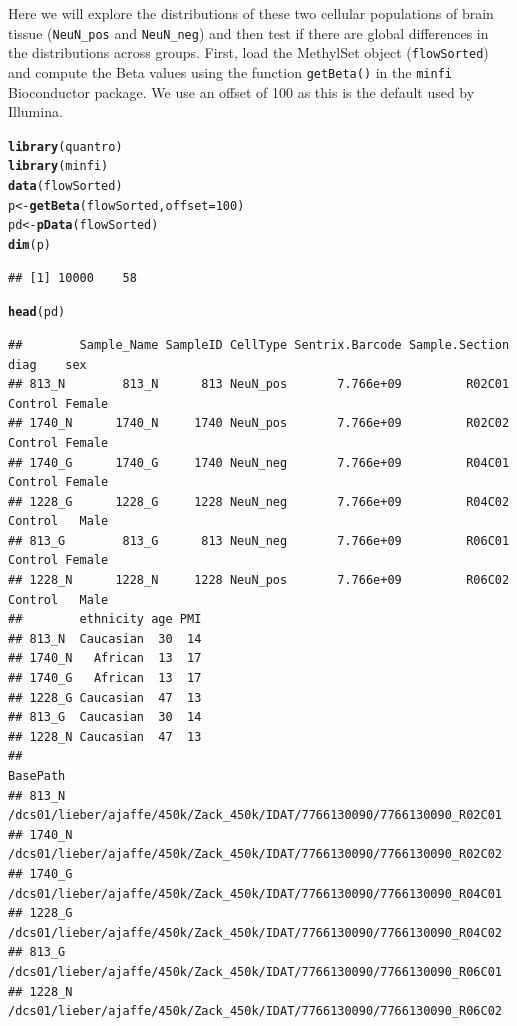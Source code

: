 \documentclass{article}\usepackage[]{graphicx}\usepackage[usenames,dvipsnames]{color}
\makeatletter
\newcommand{\hlnum}[1]{\textcolor[rgb]{0.686,0.059,0.569}{#1}}%
\newcommand{\hlstd}[1]{\textcolor[rgb]{0.345,0.345,0.345}{#1}}%
\newcommand{\hlkwb}[1]{\textcolor[rgb]{0.69,0.353,0.396}{#1}}%
\newcommand{\hlkwc}[1]{\textcolor[rgb]{0.333,0.667,0.333}{#1}}%
\newcommand{\hlkwd}[1]{\textcolor[rgb]{0.737,0.353,0.396}{\textbf{#1}}}%
\newenvironment{kframe}{%
 \def\at@end@of@kframe{}%
 \ifinner\ifhmode%
  \def\at@end@of@kframe{\end{minipage}}%
  \begin{minipage}{\columnwidth}%
 \fi\fi%
 \def\FrameCommand##1{\hskip\@totalleftmargin \hskip-\fboxsep
 \colorbox{shadecolor}{##1}\hskip-\fboxsep
     \hskip-\linewidth \hskip-\@totalleftmargin \hskip\columnwidth}%
 \MakeFramed {\advance\hsize-\width
   \@totalleftmargin\z@ \linewidth\hsize
   \@setminipage}}%
 {\par\unskip\endMakeFramed%
 \at@end@of@kframe}
\newenvironment{knitrout}{}{} %
\makeatother
\begin{document}
Here we will explore the distributions of these two cellular populations of 
brain tissue (\verb+NeuN_pos+ and \verb+NeuN_neg+) and then test if there 
are global differences in the distributions across groups. First, load the 
MethylSet object (\texttt{flowSorted}) and compute the Beta values using 
the function \texttt{getBeta()} in the \texttt{minfi} Bioconductor package. 
We use an offset of 100 as this is the default used by Illumina. 

\begin{knitrout}
\color{fgcolor}\begin{kframe}
\begin{alltt}
\hlkwd{library}\hlstd{(quantro)}
\hlkwd{library}\hlstd{(minfi)}
\hlkwd{data}\hlstd{(flowSorted)}
\hlstd{p} \hlkwb{<-} \hlkwd{getBeta}\hlstd{(flowSorted,} \hlkwc{offset} \hlstd{=} \hlnum{100}\hlstd{)}
\hlstd{pd} \hlkwb{<-} \hlkwd{pData}\hlstd{(flowSorted)}
\hlkwd{dim}\hlstd{(p)}
\end{alltt}
\begin{verbatim}
## [1] 10000    58
\end{verbatim}
\begin{alltt}
\hlkwd{head}\hlstd{(pd)}
\end{alltt}
\begin{verbatim}
##        Sample_Name SampleID CellType Sentrix.Barcode Sample.Section    diag    sex
## 813_N        813_N      813 NeuN_pos       7.766e+09         R02C01 Control Female
## 1740_N      1740_N     1740 NeuN_pos       7.766e+09         R02C02 Control Female
## 1740_G      1740_G     1740 NeuN_neg       7.766e+09         R04C01 Control Female
## 1228_G      1228_G     1228 NeuN_neg       7.766e+09         R04C02 Control   Male
## 813_G        813_G      813 NeuN_neg       7.766e+09         R06C01 Control Female
## 1228_N      1228_N     1228 NeuN_pos       7.766e+09         R06C02 Control   Male
##        ethnicity age PMI
## 813_N  Caucasian  30  14
## 1740_N   African  13  17
## 1740_G   African  13  17
## 1228_G Caucasian  47  13
## 813_G  Caucasian  30  14
## 1228_N Caucasian  47  13
##                                                                     BasePath
## 813_N  /dcs01/lieber/ajaffe/450k/Zack_450k/IDAT/7766130090/7766130090_R02C01
## 1740_N /dcs01/lieber/ajaffe/450k/Zack_450k/IDAT/7766130090/7766130090_R02C02
## 1740_G /dcs01/lieber/ajaffe/450k/Zack_450k/IDAT/7766130090/7766130090_R04C01
## 1228_G /dcs01/lieber/ajaffe/450k/Zack_450k/IDAT/7766130090/7766130090_R04C02
## 813_G  /dcs01/lieber/ajaffe/450k/Zack_450k/IDAT/7766130090/7766130090_R06C01
## 1228_N /dcs01/lieber/ajaffe/450k/Zack_450k/IDAT/7766130090/7766130090_R06C02
\end{verbatim}
\end{kframe}
\end{knitrout}
\end{document}
